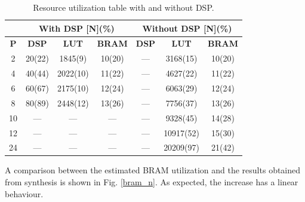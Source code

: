 \documentclass[conference,compsoc]{IEEEtran}
\begin{document}
\begin{table}[!t]
\renewcommand{\arraystretch}{1.3}
\caption{Resource utilization table with and without DSP.}
\label{res_table}
\centering
\begin{tabular}{|c|c|c|c|c|c|c|}
  \hline
  & \multicolumn{3}{c|}{\textbf{With DSP [N](\%)}} & \multicolumn{3}{c|}{\textbf{Without DSP [N](\%)}} \\ \hline
  \textbf{P}  & \textbf{DSP}            & \textbf{LUT}        & \textbf{BRAM}       & \textbf{DSP}         & \textbf{LUT}           & \textbf{BRAM}         \\ \hline
  2  & 20(22)         & 1845(9)    & 10(20)     & ---         & 3168(15)      & 10(20)         \\ \hline
  4  & 40(44)         & 2022(10)   & 11(22)     & ---         & 4627(22)      & 11(22)         \\ \hline
  6  & 60(67)         & 2175(10)   & 12(24)     & ---         & 6063(29)      & 12(24)         \\ \hline
  8  & 80(89)         & 2448(12)   & 13(26)     & ---         & 7756(37)      & 13(26)         \\ \hline
  10 & ---            & ---        & ---        & ---         & 9328(45)      & 14(28)         \\ \hline
  12 & ---            & ---        & ---        & ---         & 10917(52)     & 15(30)         \\ \hline
  24 & ---            & ---        & ---        & ---         & 20209(97)     & 21(42)         \\ \hline
\end{tabular}           
\end{table}
  
A comparison between the estimated BRAM utilization and the results obtained
from synthesis is shown in Fig. \ref{bram_n}. As expected, the increase has a
linear behaviour. 
\end{document}
